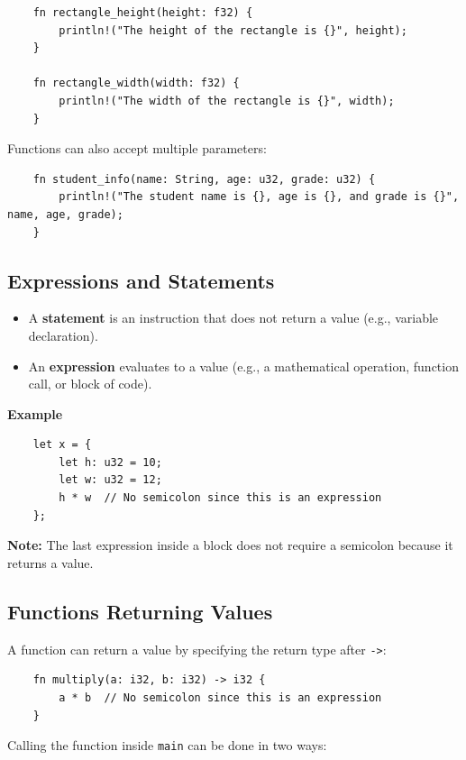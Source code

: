 \documentclass[a4paper,12pt]{report}
\begin{document}
\begin{lstlisting}
	fn rectangle_height(height: f32) {
		println!("The height of the rectangle is {}", height);
	}
	
	fn rectangle_width(width: f32) {
		println!("The width of the rectangle is {}", width);
	}
\end{lstlisting}

	\noindent Functions can also accept multiple parameters:

\begin{lstlisting}
	fn student_info(name: String, age: u32, grade: u32) {
		println!("The student name is {}, age is {}, and grade is {}", name, age, grade);
	}
\end{lstlisting}

\subsection*{Expressions and Statements}
\begin{itemize}
	\item  A \textbf{statement} is an instruction that does not return a value (e.g., variable declaration).
	\item  An \textbf{expression} evaluates to a value (e.g., a mathematical operation, function call, or block of code).
\end{itemize}

	\noindent \textbf{Example}

\begin{lstlisting}
	let x = {
		let h: u32 = 10;
		let w: u32 = 12;
		h * w  // No semicolon since this is an expression
	};
\end{lstlisting}

	\noindent \textbf{Note:} The last expression inside a block does not require a semicolon because it returns a value.

\subsection*{Functions Returning Values}

A function can return a value by specifying the return type after \texttt{->}:

\begin{lstlisting}
	fn multiply(a: i32, b: i32) -> i32 {
		a * b  // No semicolon since this is an expression
	}
\end{lstlisting}

	\noindent Calling the function inside \texttt{main} can be done in two ways:
\end{document}
